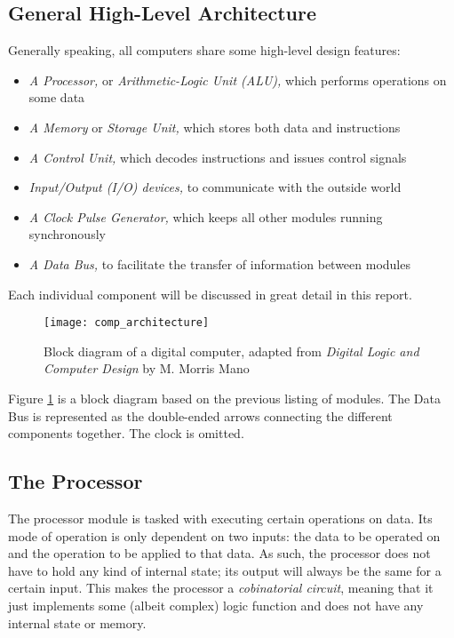 \subsection{General High-Level Architecture}
Generally speaking, all computers share some high-level design features:
\begin{itemize}
  \item \emph{A Processor,} or \emph{Arithmetic-Logic Unit (ALU),} which performs operations on some data
  \item \emph{A Memory} or \emph{Storage Unit,} which stores both data and instructions
  \item \emph{A Control Unit,} which decodes instructions and issues control signals
  \item \emph{Input/Output (I/O) devices,} to communicate with the outside world
  \item \emph{A Clock Pulse Generator,} which keeps all other modules running synchronously
  \item \emph{A Data Bus,} to facilitate the transfer of information between modules
\end{itemize}
Each individual component will be discussed in great detail in this report.

\begin{figure}[H]
  \centering
  \texttt{[image: comp\_architecture]}
  \caption{Block diagram of a digital computer, adapted from \emph{Digital Logic and Computer Design} by M. Morris Mano \cite{mano2017digital}}
  \label{comp_architecture}
\end{figure}

Figure \ref{comp_architecture} is a block diagram based on the previous listing of modules. The Data Bus is represented as the double-ended arrows connecting the different components together. The clock is omitted.

\subsection{The Processor}
The processor module is tasked with executing certain operations on data. Its mode of operation is only dependent on two inputs: the data to be operated on and the operation to be applied to that data. As such, the processor does not have to hold any kind of internal state; its output will always be the same for a certain input. This makes the processor a \emph{cobinatorial circuit}, meaning that it just implements some (albeit complex) logic function and does not have any internal state or memory.

